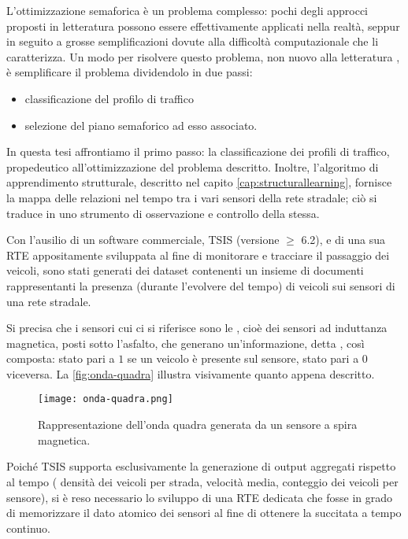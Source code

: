 L'ottimizzazione semaforica è un problema complesso: pochi degli approcci proposti in letteratura \citep{Park1998,Gershenson2008,Thorpe1996,Felici2006} possono essere effettivamente applicati nella realtà, seppur in seguito a grosse semplificazioni dovute alla difficoltà computazionale che li caratterizza. Un modo per risolvere questo problema, non nuovo alla letteratura \citep[si veda][]{Angulo2011}, è semplificare il problema dividendolo in due passi:
\begin{itemize}
    \item classificazione del profilo di traffico
    \item selezione del piano semaforico ad esso associato.
\end{itemize}
In questa tesi affrontiamo il primo passo: la classificazione dei profili di traffico, propedeutico all'ottimizzazione del problema descritto. Inoltre, l'algoritmo di apprendimento strutturale, descritto nel capito \vref{cap:structurallearning}, fornisce la mappa delle relazioni nel tempo tra i vari sensori della rete stradale; ciò si traduce in uno strumento di osservazione e controllo della stessa.

Con l'ausilio di un software commerciale, \acf{TSIS} (versione $\geq$ 6.2), e di una sua \acl{RTE} appositamente sviluppata al fine di monitorare e tracciare il passaggio dei veicoli, sono stati generati dei dataset contenenti un insieme di documenti rappresentanti la presenza (durante l'evolvere del tempo) di veicoli sui sensori di una rete stradale.

Si precisa che i sensori cui ci si riferisce sono le , cioè dei sensori ad induttanza magnetica, posti sotto l'asfalto, che generano un'informazione, detta , così composta: stato pari a $1$ se un veicolo è presente sul sensore, stato pari a $0$ viceversa. La \vref{fig:onda-quadra} illustra visivamente quanto appena descritto.
\begin{figure}[htbp]
    \centering
    \texttt{[image: onda-quadra.png]}
    \caption[Onda quadra]{Rappresentazione dell'onda quadra generata da un sensore a spira magnetica.}
    \label{fig:onda-quadra}
\end{figure}

Poiché \acs{TSIS} supporta esclusivamente la generazione di output aggregati rispetto al tempo (\eg{} densità dei veicoli per strada, velocità media, conteggio dei veicoli per sensore), si è reso necessario lo sviluppo di una \acl{RTE} dedicata che fosse in grado di memorizzare il dato atomico dei sensori al fine di ottenere la succitata  a tempo continuo.

